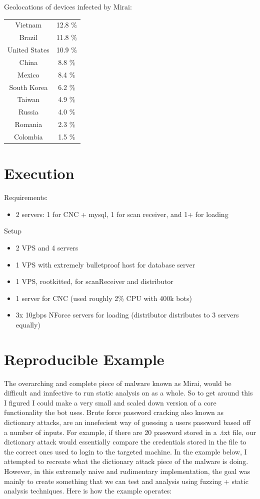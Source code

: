\documentclass[12pt, letterpaper]{article}
\begin{document}
\begin{sloppypar}
\begin{flushleft}
Geolocations of devices infected by Mirai:
\begin{center}
\begin{tabular}{c c}
Vietnam	& 12.8 \%\\
Brazil & 11.8 \%\\
United States & 10.9 \%\\
China & 8.8 \%\\
Mexico & 8.4 \%\\
South Korea	& 6.2 \%\\
Taiwan & 4.9 \%\\
Russia & 4.0 \%\\
Romania	& 2.3 \%\\
Colombia	 & 1.5 \%\\
\end{tabular}
\end{center}


\section*{Execution}

Requirements: \\
\begin{itemize}
\item 2 servers: 1 for CNC + mysql, 1 for scan receiver, and 1+ for loading
\end{itemize}

Setup
\begin{itemize}
\item 2 VPS and 4 servers
\item 1 VPS with extremely bulletproof host for database server
\item 1 VPS, rootkitted, for scanReceiver and distributor
\item 1 server for CNC (used roughly 2\% CPU with 400k bots)
\item 3x 10gbps NForce servers for loading (distributor distributes to 3 servers equally)
\end{itemize}


\section*{Reproducible Example}
The overarching and complete piece of malware known as Mirai, would be difficult and 
innfective to run static analysis on as a whole. So to get around this I figured I could
make a very small and scaled down version of a core functionality the bot uses. Brute
force password cracking also known as dictionary attacks, are an innefecient way of guessing
a users password based off a number of inputs. For example, if there are 20 password stored
in a .txt file, our dictionary attack would essentially compare the credentials stored in the
file to the correct ones used to login to the targeted machine. In the example below, I attempted 
to recreate what the dictionary attack piece of the malware is doing. However, in this extremely
naive and rudimentary implementation, the goal was mainly to create something that we can 
test and analysis using fuzzing + static analysis techniques. Here is how the example operates: 


\end{flushleft}
\end{sloppypar}
\end{document}
